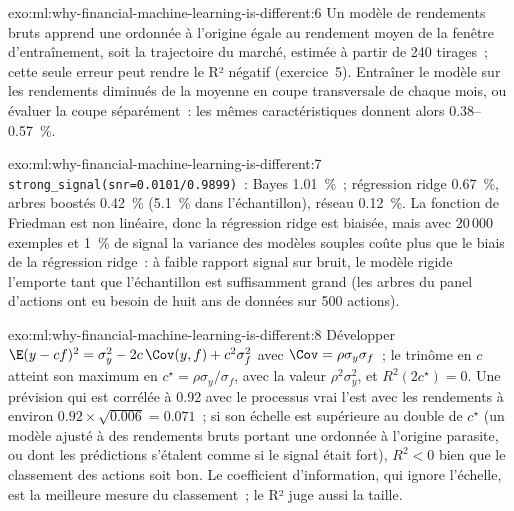 \begin{solution}{exo:ml:why-financial-machine-learning-is-different:6}
Un modèle de rendements bruts apprend une ordonnée à l'origine égale au rendement moyen de la fenêtre d'entraînement, soit la trajectoire du marché,
estimée à partir de 240 tirages~; cette seule erreur peut rendre le R² négatif (exercice~5). Entraîner le modèle sur les rendements diminués de la moyenne en coupe
transversale de chaque mois, ou évaluer la coupe séparément~: les mêmes caractéristiques donnent alors 0.38--0.57~\%.
\end{solution}

\begin{solution}{exo:ml:why-financial-machine-learning-is-different:7}
\texttt{strong\_signal(snr=0.0101/0.9899)}~: Bayes 1.01~\%~; régression ridge 0.67~\%, arbres boostés 0.42~\% (5.1~\% dans l'échantillon), réseau
0.12~\%. La fonction de Friedman est non linéaire, donc la régression ridge est biaisée, mais avec 20\,000 exemples et 1~\% de signal la variance
des modèles souples coûte plus que le biais de la régression ridge~: à faible rapport signal sur bruit, le modèle rigide l'emporte tant que l'échantillon est
suffisamment grand (les arbres du panel d'actions ont eu besoin de huit ans de données sur 500 actions).
\end{solution}

\begin{solution}{exo:ml:why-financial-machine-learning-is-different:8}
Développer $\E(y - cf)^2 = \sigma_y^2 - 2c\,\Cov(y, f) + c^2\sigma_f^2$ avec $\Cov = \rho\sigma_y\sigma_f$~; le trinôme en
$c$ atteint son maximum en $c^\star = \rho\sigma_y/\sigma_f$, avec la valeur $\rho^2\sigma_y^2$, et $R^2(2c^\star) = 0$. Une prévision qui
est corrélée à 0.92 avec le processus vrai l'est avec les rendements à environ $0.92\times\sqrt{0.006} = 0.071$~; si son échelle est
supérieure au double de $c^\star$ (un modèle ajusté à des rendements bruts portant une ordonnée à l'origine parasite, ou dont les prédictions s'étalent comme
si le signal était fort), $R^2 < 0$ bien que le classement des actions soit bon. Le coefficient d'information, qui ignore
l'échelle, est la meilleure mesure du classement~; le R² juge aussi la taille.
\end{solution}

